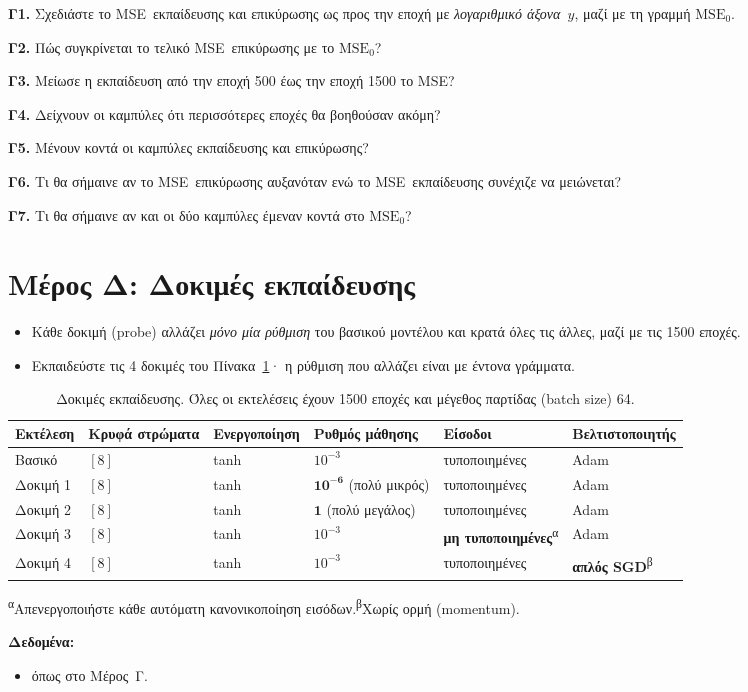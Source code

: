 \documentclass[11pt]{article}
\newcommand{\question}[2]{\par\noindent\textbf{#1.} #2\par}
\newcommand{\datause}[1]{\par\smallskip\needspace{4\baselineskip}\noindent\textbf{Δεδομένα:}\nopagebreak\begin{itemize}#1\end{itemize}}
\newcommand{\MSE}{\textlatin{MSE}}
\newcommand{\Adam}{\textlatin{Adam}}
\newcommand{\SGD}{\textlatin{SGD}}
\begin{document}
\question{Γ1}{Σχεδιάστε το \MSE\ εκπαίδευσης και επικύρωσης ως προς την εποχή με \emph{λογαριθμικό άξονα~$y$}, μαζί με τη γραμμή $\mathrm{MSE}_0$.}
\question{Γ2}{Πώς συγκρίνεται το τελικό \MSE\ επικύρωσης με το $\mathrm{MSE}_0$?}
\question{Γ3}{Μείωσε η εκπαίδευση από την εποχή 500 έως την εποχή 1500 το \MSE?}
\question{Γ4}{Δείχνουν οι καμπύλες ότι περισσότερες εποχές θα βοηθούσαν ακόμη?}
\question{Γ5}{Μένουν κοντά οι καμπύλες εκπαίδευσης και επικύρωσης?}
\question{Γ6}{Τι θα σήμαινε αν το \MSE\ επικύρωσης αυξανόταν ενώ το \MSE\ εκπαίδευσης συνέχιζε να μειώνεται?}
\question{Γ7}{Τι θα σήμαινε αν και οι δύο καμπύλες έμεναν κοντά στο $\mathrm{MSE}_0$?}

\section*{Μέρος Δ: Δοκιμές εκπαίδευσης}
\begin{itemize}
  \item \aitrap Κάθε δοκιμή (\textlatin{probe}) αλλάζει \emph{μόνο μία ρύθμιση} του βασικού μοντέλου και κρατά όλες τις άλλες, μαζί με τις 1500 εποχές.
  \item Εκπαιδεύστε τις 4 δοκιμές του Πίνακα~\ref{tab:probes}· η ρύθμιση που αλλάζει είναι με έντονα γράμματα.
\end{itemize}
\begin{table}[htbp]
\centering
\small
\begin{tabular}{@{}llllll@{}}
\toprule
Εκτέλεση & Κρυφά στρώματα & Ενεργοποίηση & Ρυθμός μάθησης & Είσοδοι & Βελτιστοποιητής \\
\midrule
Βασικό & $[8]$ & \textlatin{tanh} & $10^{-3}$ & τυποποιημένες & \Adam \\
Δοκιμή 1 & $[8]$ & \textlatin{tanh} & $\mathbf{10^{-6}}$ (πολύ μικρός) & τυποποιημένες & \Adam \\
Δοκιμή 2 & $[8]$ & \textlatin{tanh} & $\mathbf{1}$ (πολύ μεγάλος) & τυποποιημένες & \Adam \\
Δοκιμή 3 & $[8]$ & \textlatin{tanh} & $10^{-3}$ & \textbf{μη τυποποιημένες}\textsuperscript{α} & \Adam \\
Δοκιμή 4 & $[8]$ & \textlatin{tanh} & $10^{-3}$ & τυποποιημένες & \textbf{απλός \SGD}\textsuperscript{β} \\
\bottomrule
\end{tabular}

\smallskip
\footnotesize\textsuperscript{α}Απενεργοποιήστε κάθε αυτόματη κανονικοποίηση εισόδων.\quad\textsuperscript{β}Χωρίς ορμή (\textlatin{momentum}).
\caption{Δοκιμές εκπαίδευσης. Όλες οι εκτελέσεις έχουν 1500 εποχές και μέγεθος παρτίδας (\textlatin{batch size}) 64.}\label{tab:probes}
\end{table}
\datause{\item όπως στο Μέρος~Γ.}
\end{document}
